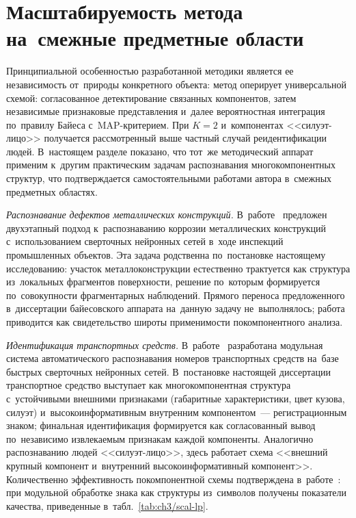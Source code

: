 \section{Масштабируемость метода на~смежные предметные области}\label{sec:ch3/scalability}

Принципиальной особенностью разработанной методики является ее
независимость от~природы конкретного объекта: метод оперирует
универсальной схемой: согласованное детектирование связанных
компонентов, затем независимые признаковые представления и~далее
вероятностная интеграция по~правилу Байеса с~MAP-критерием. При
$K=2$ и~компонентах <<силуэт-лицо>> получается рассмотренный выше
частный случай реидентификации людей. В~настоящем разделе показано,
что тот~же методический аппарат применим к~другим практическим
задачам распознавания многокомпонентных структур, что подтверждается
самостоятельными работами автора в~смежных предметных областях.

\textit{Распознавание дефектов металлических конструкций.} В~работе~\cite{Rusakov2021corrosion}
предложен двухэтапный подход к~распознаванию коррозии металлических
конструкций с~использованием сверточных нейронных сетей в~ходе
инспекций промышленных объектов. Эта задача родственна
по~постановке настоящему исследованию: участок металлоконструкции
естественно трактуется как структура из~локальных фрагментов
поверхности, решение по~которым формируется по~совокупности
фрагментарных наблюдений. Прямого переноса предложенного
в~диссертации байесовского аппарата на~данную задачу не~выполнялось;
работа приводится как свидетельство широты применимости
покомпонентного анализа.

\textit{Идентификация транспортных средств.} В~работе~\cite{Rusakov2020license}
разработана модульная система автоматического распознавания номеров
транспортных средств на~базе быстрых сверточных нейронных сетей.
В~постановке настоящей диссертации транспортное средство выступает
как многокомпонентная структура с~устойчивыми внешними признаками
(габаритные характеристики, цвет кузова, силуэт) и~высокоинформативным
внутренним компонентом~--- регистрационным знаком; финальная
идентификация формируется как согласованный вывод по~независимо
извлекаемым признакам каждой компоненты. Аналогично распознаванию
людей <<силуэт-лицо>>, здесь работает схема <<внешний крупный
компонент и~внутренний высокоинформативный компонент>>.
Количественно эффективность покомпонентной схемы подтверждена
в~работе~\cite{Rusakov2020license}: при модульной обработке знака как
структуры из~символов получены показатели качества, приведенные
в~табл.~\ref{tab:ch3/scal-lp}.

